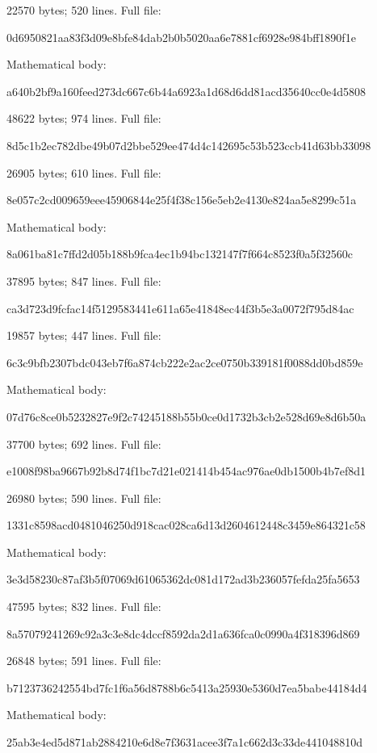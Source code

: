 \documentclass[11pt]{article}
\newcommand{\sha}[2]{\par{\small\ttfamily #1\allowbreak #2}\par}
\begin{document}
\medskip\noindent\textbf{}
22570 bytes; 520 lines. Full file:
\sha{0d6950821aa83f3d09e8bfe84dab2b0b}{5020aa6e7881cf6928e984bff1890f1e}
Mathematical body:
\sha{a640b2bf9a160feed273dc667c6b44a6}{923a1d68d6dd81acd35640cc0e4d5808}
\medskip\noindent\textbf{}
48622 bytes; 974 lines. Full file:
\sha{8d5c1b2ec782dbe49b07d2bbe529ee47}{4d4c142695c53b523ccb41d63bb33098}
\medskip\noindent\textbf{}
26905 bytes; 610 lines. Full file:
\sha{8e057c2cd009659eee45906844e25f4f}{38c156e5eb2e4130e824aa5e8299c51a}
Mathematical body:
\sha{8a061ba81c7ffd2d05b188b9fca4ec1b}{94bc132147f7f664c8523f0a5f32560c}
\medskip\noindent\textbf{}
37895 bytes; 847 lines. Full file:
\sha{ca3d723d9fcfac14f5129583441e611a}{65e41848ec44f3b5e3a0072f795d84ac}
\medskip\noindent\textbf{}
19857 bytes; 447 lines. Full file:
\sha{6c3c9bfb2307bdc043eb7f6a874cb222}{e2ac2ce0750b339181f0088dd0bd859e}
Mathematical body:
\sha{07d76c8ce0b5232827e9f2c74245188b}{55b0ce0d1732b3cb2e528d69e8d6b50a}
\medskip\noindent\textbf{}
37700 bytes; 692 lines. Full file:
\sha{e1008f98ba9667b92b8d74f1bc7d21e0}{21414b454ac976ae0db1500b4b7ef8d1}
\medskip\noindent\textbf{}
26980 bytes; 590 lines. Full file:
\sha{1331c8598acd0481046250d918cac028}{ca6d13d2604612448c3459e864321c58}
Mathematical body:
\sha{3e3d58230c87af3b5f07069d61065362}{dc081d172ad3b236057fefda25fa5653}
\medskip\noindent\textbf{}
47595 bytes; 832 lines. Full file:
\sha{8a57079241269c92a3c3e8dc4dccf859}{2da2d1a636fca0c0990a4f318396d869}
\medskip\noindent\textbf{}
26848 bytes; 591 lines. Full file:
\sha{b7123736242554bd7fc1f6a56d8788b6}{c5413a25930e5360d7ea5babe44184d4}
Mathematical body:
\sha{25ab3e4ed5d871ab2884210e6d8e7f36}{31acee3f7a1c662d3c33de441048810d}
\end{document}
